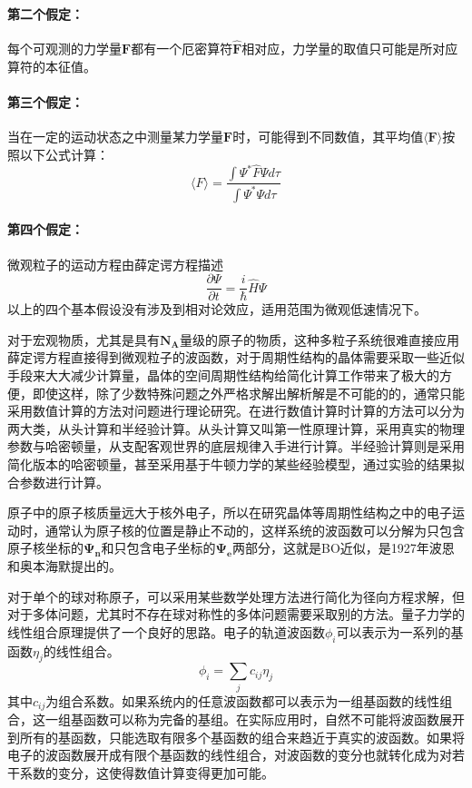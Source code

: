 \paragraph{第二个假定：}每个可观测的力学量$\bm{F}$都有一个厄密算符$\bm{\hat{F}} $相对应，力学量的取值只可能是所对应算符的本征值。
\paragraph{第三个假定：}当在一定的运动状态之中测量某力学量$\bm{F}$时，可能得到不同数值，其平均值$\langle \bm{F} \rangle$按照以下公式计算：
\begin{equation}
    \label{eq1}
    \langle F \rangle = \frac{\int \Psi^{*} \hat{F}\Psi d \tau}{\int \Psi^{*} \Psi d \tau}
\end{equation}
\paragraph{第四个假定：}微观粒子的运动方程由薛定谔方程描述
\begin{equation}
    \label{eq2}
    \frac{\partial \Psi}{\partial t}= \frac{i}{\hbar} \hat{H} \Psi
\end{equation}
以上的四个基本假设没有涉及到相对论效应，适用范围为微观低速情况下。

对于宏观物质，尤其是具有$\bm{N_{A}}$量级的原子的物质，这种多粒子系统很难直接应用薛定谔方程直接得到微观粒子的波函数，对于周期性结构的晶体需要采取一些近似手段来大大减少计算量，晶体的空间周期性结构给简化计算工作带来了极大的方便，即使这样，除了少数特殊问题之外严格求解出解析解是不可能的的，通常只能采用数值计算的方法对问题进行理论研究。在进行数值计算时计算的方法可以分为两大类，从头计算和半经验计算。从头计算又叫第一性原理计算，采用真实的物理参数与哈密顿量，从支配客观世界的底层规律入手进行计算。半经验计算则是采用简化版本的哈密顿量，甚至采用基于牛顿力学的某些经验模型，通过实验的结果拟合参数进行计算。

原子中的原子核质量远大于核外电子，所以在研究晶体等周期性结构之中的电子运动时，通常认为原子核的位置是静止不动的，这样系统的波函数可以分解为只包含原子核坐标的$\bm{\Psi_{n}}$和只包含电子坐标的$\bm{\Psi_{e}}$两部分，这就是BO近似，是1927年波恩和奥本海默提出的。

对于单个的球对称原子，可以采用某些数学处理方法进行简化为径向方程求解，但对于多体问题，尤其时不存在球对称性的多体问题需要采取别的方法。量子力学的线性组合原理提供了一个良好的思路。电子的轨道波函数$\phi_{i}$可以表示为一系列的基函数$\eta_{j}$的线性组合。
\begin{equation}
    \label{eq3}
    \phi_{i} = \sum_{j} c_{ij} \eta_{j}
\end{equation}
其中$c_{ij}$为组合系数。如果系统内的任意波函数都可以表示为一组基函数的线性组合，这一组基函数可以称为完备的基组。在实际应用时，自然不可能将波函数展开到所有的基函数，只能选取有限多个基函数的组合来趋近于真实的波函数。如果将电子的波函数展开成有限个基函数的线性组合，对波函数的变分也就转化成为对若干系数的变分，这使得数值计算变得更加可能。

